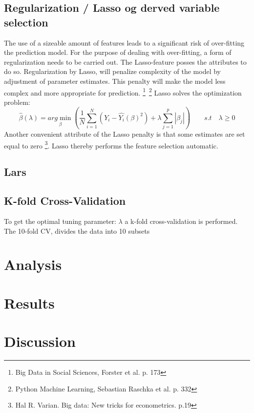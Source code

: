 \documentclass[12pt,a4paper]{article}
\begin{document}
\subsection{Regularization / Lasso og derved variable selection}
The use of a sizeable amount of features leads to a significant risk of over-fitting the prediction model. 
For the purpose of dealing with over-fitting, a form of regularization needs to be carried out. The Lasso-feature posses the attributes to do so. Regularization by Lasso, will penalize complexity of the model by adjustment of parameter estimates. This penalty will make the model less complex and more appropriate for prediction. \footnote{Big Data in Social Sciences, Forster et al. p. 173}\, \footnote{Python Machine Learning, Sebastian Raschka et al. p. 332}
\newline Lasso solves the optimization problem: $$\hat{\beta}(\lambda)=\underset{\beta}{arg\min} \left(\frac{1}{N} \sum_{i=1}^{N} (Y_i-\hat{Y_i}(\beta)^2)+\lambda\sum_{j=1}^{p}|\beta_j|\right) \qquad s.t \quad \lambda \geq 0 $$
Another convenient attribute of the Lasso penalty is that some estimates are set equal to zero \footnote{Hal R. Varian. Big data: New tricks for econometrics. p.19}. Lasso thereby performs the feature selection automatic.   

\subsection{Lars}

\subsection{K-fold Cross-Validation}
To get the optimal tuning parameter: $\lambda$ a k-fold cross-validation is performed. The 10-fold CV, divides the data into 10 subsets  



\section{Analysis}

\section{Results}

\section{Discussion}
\end{document}
